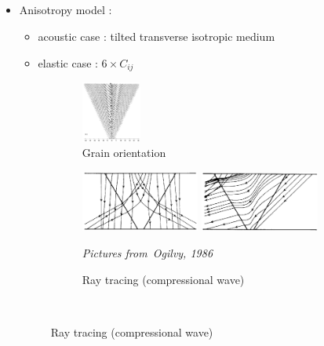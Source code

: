 \documentclass[10pt,xcolor=x11names,compress, notes=show]{beamer}%
\begin{document}
\subsection*{}
\begin{frame}{\insertsectionhead}
\setlength{\leftmargin}{-1cm}
\setlength{\rightmargin}{-1cm}

	\begin{itemize}
		\item<2-> Anisotropy model : 
		\begin{itemize}
			\item acoustic case : tilted transverse isotropic medium
			\item elastic case : $6\times C_{ij}$
		\end{itemize} 
		\begin{figure}[!h]
		    \centering
		    \hspace{-1cm}\begin{subfigure}[b]{0.25\textwidth}
		    	\centering
		 		\includegraphics[height=2cm]{img/ogilvy_model.png}
		 		\vspace{0.2cm}\caption{\centering \scriptsize Grain orientation}
			\end{subfigure}
			\begin{subfigure}[b]{0.7\textwidth}
				\centering
		 		\includegraphics[height=2cm]{img/ogilvy_ray1.png}
		 		\includegraphics[height=2cm]{img/ogilvy_ray2.png}\\
		 		\raggedright{\vspace{-0.25cm}\tiny{\itshape Pictures from~Ogilvy, 1986}}
		 		\caption{\scriptsize Ray tracing (compressional wave) }
			\end{subfigure}\\
				

\end{figure}
\end{itemize}
\end{frame}
\end{document}

